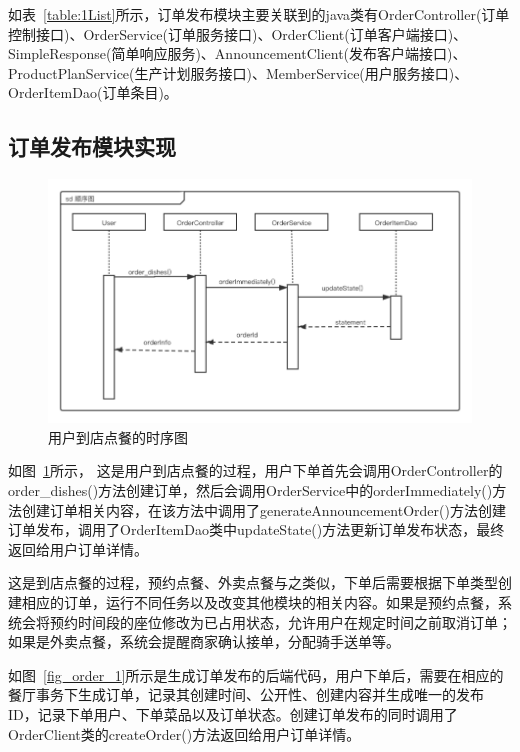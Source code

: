 如表~\ref{table:1List}所示，订单发布模块主要关联到的java类有OrderController(订单控制接口)、OrderService(订单服务接口)、OrderClient(订单客户端接口)、SimpleResponse(简单响应服务)、AnnouncementClient(发布客户端接口)、ProductPlanService(生产计划服务接口)、MemberService(用户服务接口)、OrderItemDao(订单条目)。\\

\subsection{订单发布模块实现}

\begin{figure}[htbp!]
    \centering
    \includegraphics[width=5in]{FIGs/chapter4/order_time.pdf}
    \caption{用户到店点餐的时序图}\label{fig_order_time}
\end{figure}

如图~\ref{fig_order_time}所示，
这是用户到店点餐的过程，用户下单首先会调用OrderController的order\_dishes()方法创建订单，然后会调用OrderService中的orderImmediately()方法创建订单相关内容，在该方法中调用了generateAnnouncementOrder()方法创建订单发布，调用了OrderItemDao类中updateState()方法更新订单发布状态，最终返回给用户订单详情。

这是到店点餐的过程，预约点餐、外卖点餐与之类似，下单后需要根据下单类型创建相应的订单，运行不同任务以及改变其他模块的相关内容。如果是预约点餐，系统会将预约时间段的座位修改为已占用状态，允许用户在规定时间之前取消订单；如果是外卖点餐，系统会提醒商家确认接单，分配骑手送单等。

如图~\ref{fig_order_1}所示是生成订单发布的后端代码，用户下单后，需要在相应的餐厅事务下生成订单，记录其创建时间、公开性、创建内容并生成唯一的发布ID，记录下单用户、下单菜品以及订单状态。创建订单发布的同时调用了OrderClient类的createOrder()方法返回给用户订单详情。

